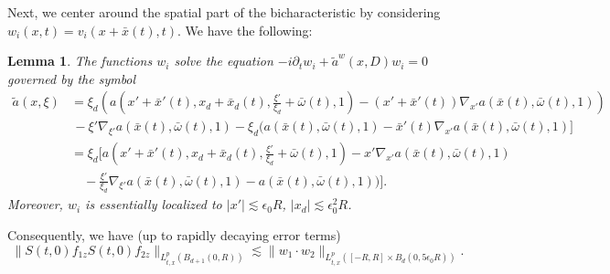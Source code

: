\documentclass{amsart}
\newtheorem{lemma}[theorem]{Lemma}
\theoremstyle{definition}
\begin{document}
Next, we center around the spatial part of the bicharacteristic by considering $w_i(x,t) = v_i(x+\bar{x}(t),t)$. We have the following:
\begin{lemma}
The functions $w_i$ solve the equation $-i \partial_t w_i + \tilde{a}^w(x,D) w_i = 0$ governed by the symbol
\begin{equation*}
\begin{split}
\tilde{a}(x,\xi) &= \xi_d (a(x'+\bar{x}'(t),x_d+\bar{x}_d(t),\frac{\xi'}{\xi_d}+\bar{\omega}(t),1) - (x'+\bar{x}'(t)) \nabla_{x'} a(\bar{x}(t),\bar{\omega}(t),1)) \\
&\, - \xi' \nabla_{\xi'} a(\bar{x}(t),\bar{\omega}(t),1) - \xi_d (a(\bar{x}(t),\bar{\omega}(t),1) - \bar{x}'(t) \nabla_{x'} a(\bar{x}(t),\bar{\omega}(t),1)] \\
&= \xi_d [ a(x'+\bar{x}'(t),x_d+\bar{x}_d(t),\frac{\xi'}{\xi_d}+\bar{\omega}(t),1) - x' \nabla_{x'} a(\bar{x}(t),\bar{\omega}(t),1) \\
&\quad - \frac{\xi'}{\xi_d} \nabla_{\xi'} a(\bar{x}(t),\bar{\omega}(t),1) - a(\bar{x}(t),\bar{\omega}(t),1))].
\end{split}
\end{equation*}
Moreover, $w_i$ is essentially localized to $|x'| \lesssim \epsilon_0 R$, $|x_d| \lesssim \epsilon_0^2 R$.
\end{lemma}
Consequently, we have (up to rapidly decaying error terms)
\begin{equation*}
\| S(t,0) f_{1z } S(t,0) f_{2z} \|_{L^p_{t,x}(B_{d+1}(0,R))} \lesssim \| w_1 \cdot w_2 \|_{L^p_{t,x}([-R,R] \times B_d(0,5 \epsilon_0 R))}.
\end{equation*}
\end{document}

